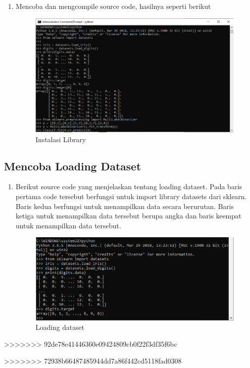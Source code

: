 \begin{enumerate}
\item Mencoba dan mengcompile source code, hasilnya seperti berikut
\begin{figure}[ht]
\centering
\includegraphics[scale=0.5]{figures/19.png}
\caption{Instalasi Library}
\end{figure}
\end{enumerate}

\subsection{Mencoba Loading Dataset}
\begin{enumerate}
\item Berikut source code yang menjelaskan tentang loading dataset. Pada baris pertama code tersebut berfungsi untuk import library datasets dari sklearn. Baris kedua berfungsi untuk menampilkan data secara berurutan. Baris ketiga untuk menampilkan data tersebut berupa angka dan baris keempat untuk menampilkan data tersebut.
\begin{figure}[ht]
\centering
\includegraphics[scale=0.5]{figures/20.png}
\caption{Loading dataset}
\end{figure}
\end{enumerate}
>>>>>>> 92de78e41446360e09424809cb0f22f3df35f6bc

>>>>>>> 72938b66487485944dd7a86f442cd5118fad0308

